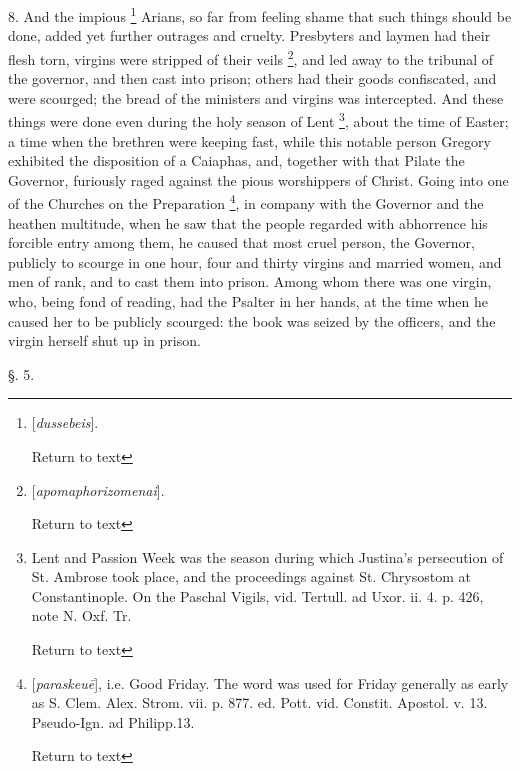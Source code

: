8. And the impious \footnote{[\emph{dussebeis}].

Return to text} Arians, so far from feeling shame that such things should be
done, added yet further outrages and cruelty. Presbyters and laymen
had their flesh torn, virgins were stripped of their veils \footnote{[\emph{apomaphorizomenai}].

Return to text}, and led away to the tribunal of the governor, and then cast
into prison; others had their goods confiscated, and were scourged;
the bread of the ministers and virgins was intercepted. And these
things were done even during the holy season of Lent \footnote{Lent and Passion Week was the season during which Justina's
persecution of St. Ambrose took place, and the proceedings against St.
Chrysostom at Constantinople. On the Paschal Vigils, vid. Tertull. ad
Uxor. ii. 4. p. 426, note N. Oxf. Tr.

Return to text}, about the time of Easter; a time when the brethren were
keeping fast, while this notable person Gregory exhibited the
disposition of a Caiaphas, and, together with that Pilate the
Governor, furiously raged against the pious worshippers of Christ.
Going into one of the Churches on the Preparation \footnote{[\emph{paraskeu\={e}}], i.e. Good Friday. The word was used for
Friday generally as early as S. Clem. Alex. Strom. vii. p. 877. ed.
Pott. vid. Constit. Apostol. v. 13. Pseudo-Ign. ad Philipp.13.

Return to text

}, in company with the Governor and the heathen multitude, when
he saw that the people regarded with abhorrence his forcible entry
among them, he caused that most cruel person, the Governor, publicly
to scourge in one hour, four and thirty virgins and married women, and
men of rank, and to cast them into prison. Among whom there was one
virgin, who, being fond of reading, had the Psalter in her hands, at
the time when he caused her to be publicly scourged: the book was
seized by the officers, and the virgin herself shut up in prison.

§. 5.

